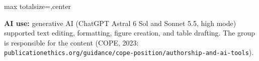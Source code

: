 \documentclass[12pt]{article}
\begin{document}
\begin{adjustbox}{max totalsize={\textwidth}{\textheight},center}
{%
\vspace{2mm}
{\fontsize{10.5}{13}\selectfont\color{ctxText}\textbf{AI use:} generative AI (ChatGPT Astral 6 Sol and Sonnet 5.5, high mode) supported text editing, formatting, figure creation, and table drafting. The group is responsible for the content (COPE, 2023: \texttt{publicationethics.org/guidance/cope-position/authorship-and-ai-tools}).\par}

}%
\end{adjustbox}
\end{document}
